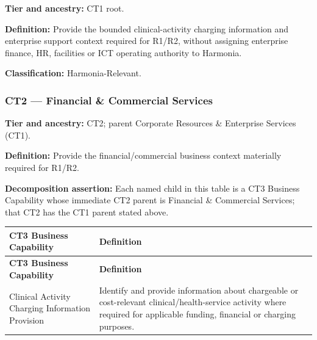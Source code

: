 \textbf{Tier and ancestry:} CT1 root.

\label{rad:business:952}

\textbf{Definition:} Provide the bounded clinical-activity charging information and enterprise support context required for R1/\allowbreak{}R2, without assigning enterprise finance, HR, facilities or ICT operating authority to Harmonia.

\label{rad:business:954}

\textbf{Classification:} Harmonia-Relevant.

\label{rad:business:956}
\subsubsection*{CT2 — Financial \& Commercial Services}
\label{rad:business:958}

\textbf{Tier and ancestry:} CT2; parent Corporate Resources \& Enterprise Services (CT1).

\label{rad:business:960}

\textbf{Definition:} Provide the financial/\allowbreak{}commercial business context materially required for R1/\allowbreak{}R2.

\label{rad:business:962}

\textbf{Decomposition assertion:} Each named child in this table is a CT3 Business Capability whose immediate CT2 parent is Financial \& Commercial Services; that CT2 has the CT1 parent stated above.

\label{rad:business:964}
\begingroup\small\setlength{\TableWidth}{\dimexpr\linewidth-4\tabcolsep-3\arrayrulewidth\relax}
\begin{longtable}{|>{\raggedright\arraybackslash}p{0.35\TableWidth}|>{\raggedright\arraybackslash}p{0.65\TableWidth}|}
\hline\rowcolor{TableHead}\textbf{CT3 Business Capability} & \textbf{Definition}\\\hline\endfirsthead
\hline\rowcolor{TableHead}\textbf{CT3 Business Capability} & \textbf{Definition}\\\hline\endhead
\hline\endfoot
Clinical Activity Charging Information Provision & Identify and provide information about chargeable or cost-relevant clinical/\allowbreak{}health-service activity where required for applicable funding, financial or charging purposes.\\\hline
\end{longtable}\endgroup
{}\label{rad:business:968}

